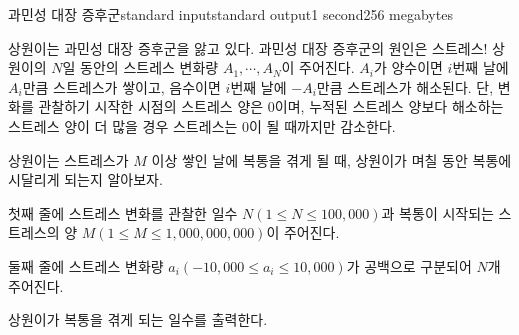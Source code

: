 \begin{problem}{과민성 대장 증후군}{standard input}{standard output}{1 second}{256 megabytes}

상원이는 과민성 대장 증후군을 앓고 있다. 과민성 대장 증후군의 원인은 스트레스! 상원이의 $N$일 동안의 스트레스 변화량 $A_1, \cdots, A_N$이 주어진다. $A_i$가 양수이면 $i$번째 날에 $A_i$만큼 스트레스가 쌓이고, 음수이면 $i$번째 날에 $-A_i$만큼 스트레스가 해소된다. 단, 변화를 관찰하기 시작한 시점의 스트레스 양은 $0$이며, 누적된 스트레스 양보다 해소하는 스트레스 양이 더 많을 경우 스트레스는 $0$이 될 때까지만 감소한다.

상원이는 스트레스가 $M$ 이상 쌓인 날에 복통을 겪게 될 때, 상원이가 며칠 동안 복통에 시달리게 되는지 알아보자.

\InputFile
첫째 줄에 스트레스 변화를 관찰한 일수 $N (1 \leq N \leq 100,000)$과 복통이 시작되는 스트레스의 양 $M (1 \leq M \leq 1,000,000,000)$이 주어진다.

둘째 줄에 스트레스 변화량 $a_i (-10,000 \leq a_i \leq 10,000)$가 공백으로 구분되어 $N$개 주어진다.

\OutputFile
상원이가 복통을 겪게 되는 일수를 출력한다.

\Examples

\begin{example}
%
%
\end{example}

\end{problem}

